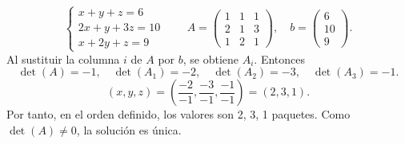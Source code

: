 \documentclass[11pt,a4paper]{article}
\begin{document}
\begin{enumerate}
\[\begin{cases}x+y+z=6\\2x+y+3z=10\\x+2y+z=9\end{cases}\qquad A=\begin{pmatrix}1&1&1\\2&1&3\\1&2&1\end{pmatrix},\quad b=\begin{pmatrix}6\\10\\9\end{pmatrix}.\]
Al sustituir la columna $i$ de $A$ por $b$, se obtiene $A_i$. Entonces
\[\det(A)=-1,\quad \det(A_1)=-2,\quad \det(A_2)=-3,\quad \det(A_3)=-1.\]
\[(x,y,z)=\left(\frac{-2}{-1},\frac{-3}{-1},\frac{-1}{-1}\right)=(2,3,1).\]
Por tanto, en el orden definido, los valores son 2, 3, 1 paquetes. Como $\det(A)\ne0$, la solución es única.
\end{enumerate}
\end{document}
